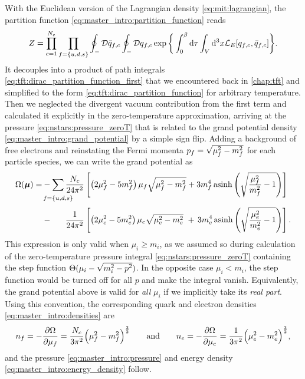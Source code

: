 With the Euclidean version of the Lagrangian density \eqref{eq:mit:lagrangian},
the partition function \eqref{eq:master_intro:partition_function} reads
\begin{equation}
	Z = \prod_{c=1}^{N_c} \prod_{f=\{u,d,s\}} \oint_- \mathcal{D} \bar{q}_{f,c} \oint_- \mathcal{D} q_{f,c} \exp \bigg\{ \int_0^\beta \mathop{}\!\mathrm{d} \tau \int_V \mathop{}\!\mathrm{d}^3 x \mathcal{L}_E [q_{f,c},\bar{q}_{f,c}] \bigg\} .
\end{equation}
It decouples into a product of path integrals \eqref{eq:tft:dirac_partition_function_first} that we encountered back in \cref{chap:tft}
and simplified to the form \eqref{eq:tft:dirac_partition_function} for arbitrary temperature.
Then we neglected the divergent vacuum contribution from the first term and calculated it explicitly in the zero-temperature approximation,
arriving at the pressure \eqref{eq:nstars:pressure_zeroT} that is related to the grand potential density \eqref{eq:master_intro:grand_potential} by a simple sign flip.
Adding a background of free electrons and reinstating the Fermi momenta $p_f = \sqrt{\smash[b]{\mu_f^2-m_f^2}}$ for each particle species,
we can write the grand potential as
\begin{equation}
\begin{split}
	\Omega(\vec{\mu}) = &-\smashoperator{\sum_{\vphantom{\big|} f=\{u,d,s\}}} \frac{N_c}{24 \pi^2} \left[ \left( 2 \mu_f^2 - 5 m_f^2 \right) \mu_f \sqrt{\mu_f^2 - m_f^2} + 3 m_f^4 \asinh \left( \sqrt{\frac{\mu_{\smash{f}}^2}{m_f^2}-1} \right) \right] \\
	                    &-\phantom{\sum} \, \frac{1}{24 \pi^2} \left[ \left( 2 \mu_e^2 - 5 m_e^2 \right) \mu_e \sqrt{\mu_e^2 - m_e^2} \, \, + \, 3 m_e^4 \asinh \left( \sqrt{\frac{\mu_{\smash{e}}^2}{m_e^2}-1} \right) \right].
\label{eq:mit:grand_potential}
\end{split}
\end{equation}
This expression is only valid when $\mu_i \geq m_i$,
as we assumed so during calculation of the zero-temperature pressure integral \eqref{eq:nstars:pressure_zeroT} containing the step function $\Theta(\mu_i-\sqrt{\smash[b]{m_i^2-p^2}})$.
In the opposite case $\mu_i < m_i$, the step function would be turned off for all $p$ and make the integral vanish.
Equivalently, the grand potential above is valid for \emph{all} $\mu_i$ if we implicitly take its \emph{real part}.
Using this convention, the corresponding quark and electron densities \eqref{eq:master_intro:densities} are
\begin{equation}
	n_f = -\pdv{\Omega}{\mu_f} = \frac{N_c}{3 \pi^2} \Big( \mu_f^2 - m_f^2 \Big)^{\frac32}
	\qquad \text{and} \qquad
	n_e = -\pdv{\Omega}{\mu_e} = \frac{  1}{3 \pi^2} \Big( \mu_e^2 - m_e^2 \Big)^{\frac32},
\label{eq:mit:particle_densities}%
\end{equation}
and the pressure \eqref{eq:master_intro:pressure} and energy density \eqref{eq:master_intro:energy_density} follow.

